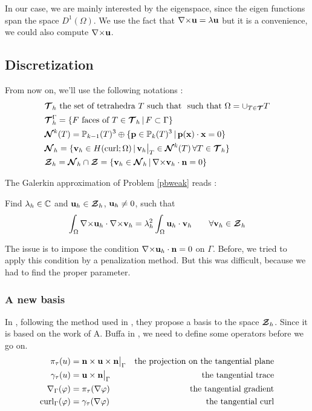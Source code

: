 \begin{rk}
In our case, we are mainly interested by the eigenspace, since the
eigen functions span the space $D^1(\Omega)$. We use the fact that
${\nabla\times}{\mathbf{u}}=\lambda{\mathbf{u}}$ but it is a convenience, we could
also compute ${\nabla\times}{\mathbf{u}}$.
\end{rk}

\subsection{Discretization}
From now on, we'll use the following notations :
\begin{align*}
&{\bm{\mathcal{T}}}_h\mbox{ the set of tetrahedra } T \mbox{ such that }
\mbox{ such that } \Omega=\cup_{T\in{\bm{\mathcal{T}}}}T\\
&{\bm{\mathcal{T}}}_h^\Gamma =\{F\mbox{ faces of } T\in {\bm{\mathcal{T}}}_h \,|\, F\subset \Gamma
\}\\
&{\bm{\mathcal{N}}}^k(T)={\mathbb{P}}_{k-1}(T)^3\oplus\{{\mathbf{p}}\in{\mathbb{P}}_k(T)^3 \,|\,
{\mathbf{p(x)}}\cdot{\mathbf{x}}=0 \}\\
&{\bm{\mathcal{N}}}_h=\{{\mathbf{v}}_h\in H(\mathrm{curl};\Omega) \,|\,
{\mathbf{v}}_h{\big\rvert_{T}}\in{\bm{\mathcal{N}}}^k(T)\, \forall T\in {\bm{\mathcal{T}}}_h \}\\
&{\bm{\mathcal{Z}}}_h={\bm{\mathcal{N}}}_h\cap{\bm{\mathcal{Z}}}=\{{\mathbf{v}}_h\in{\bm{\mathcal{N}}}_h \,|\,
{\nabla\times}{\mathbf{v}}_h\cdot{\mathbf{n}} = 0 \}
\end{align*}

The Galerkin approximation of Problem \ref{pbweak} reads :
\begin{pb}\label{pbdiscr}
Find $\lambda_h\in{\mathbb{C}}$ and ${\mathbf{u}}_h\in{\bm{\mathcal{Z}}}_h$, ${\mathbf{u}}_h\ne
0$, such that
\[\int_\Omega {\nabla\times}{\mathbf{u}}_h\cdot{\nabla\times}{\mathbf{v}}_h =
\lambda_h^2\int_\Omega {\mathbf{u}}_h\cdot{\mathbf{v}}_h \quad\quad
\forall{\mathbf{v}}_h\in{\bm{\mathcal{Z}}}_h \]
\end{pb}

The issue is to impose the condition
${\nabla\times}{\mathbf{u}}_h\cdot{\mathbf{n}}=0$ on $\Gamma$. Before, we tried to apply this
condition by a penalization method. But this was difficult, because we had to
find the proper parameter.\\

\subsubsection{A new basis}
\label{base}
In \cite{Venegas2013}, following the method used in
\cite{Meddahi2003,Salgado2005}, they propose a basis to the space ${\bm{\mathcal{Z}}}_h$.
Since it is based on the work of A. Buffa in \cite{Buffa2002845}, we need to
define some operators before we go on.
\begin{align*}
\pi_\tau(u) &= {\mathbf{n}}\times{\mathbf{u}}\times{\mathbf{n}}{\big\rvert_{\Gamma}} &\mbox{the projection on
  the tangential plane}\\
\gamma_\tau(u) &= {\mathbf{u}}\times{\mathbf{n}}{\big\rvert_{\Gamma}} &\mbox{the tangential
  trace}\\
{\nabla}_\Gamma(\varphi) &= \pi_\tau({\nabla}\varphi) &\mbox{the tangential gradient}\\
\mathrm{curl}_\Gamma(\varphi) &= \gamma_\tau({\nabla}\varphi) &\mbox{the tangential curl}
\end{align*}

